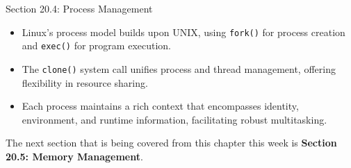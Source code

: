 \begin{notes}{Section 20.4: Process Management}
    \begin{highlight}
        \begin{itemize}
            \item Linux's process model builds upon UNIX, using \texttt{fork()} for process creation and \texttt{exec()} for program execution.
            \item The \texttt{clone()} system call unifies process and thread management, offering flexibility in resource sharing.
            \item Each process maintains a rich context that encompasses identity, environment, and runtime information, facilitating robust multitasking.
        \end{itemize}
    \end{highlight}
\end{notes}

The next section that is being covered from this chapter this week is \textbf{Section 20.5: Memory Management}.

